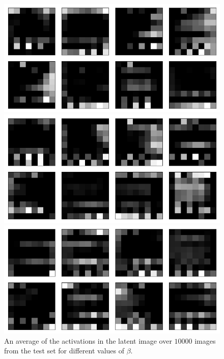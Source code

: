\begin{figure}[h!]
\centering
\captionsetup{justification=centering}

    \includegraphics[scale=0.3]{figures/results/naive_average/beta_1_average_activation.png}
    \caption{$\beta=1$}
    \includegraphics[scale=0.3]{figures/results/naive_average/beta_2_average_activation.png}
    \caption{$\beta=2$}
    \includegraphics[scale=0.3]{figures/results/naive_average/beta_4_average_activation.png}
    \caption{$\beta=4$}

\caption{An average of the activations in the latent image over $10000$ images from the test set for different values of $\beta$.}
\label{fig:naive_average_originals_posterior_samples}
\end{figure}



